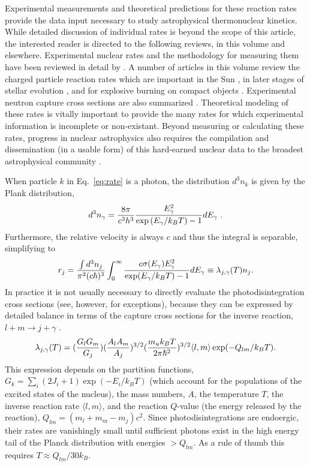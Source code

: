 \documentclass[12pt,modern,tighten,times,apj]{aastex61}
\begin{document}
Experimental measurements and theoretical predictions for these reaction rates provide the data input necessary to study astrophysical thermonuclear kinetics.  
While detailed discussion of individual rates is beyond the scope of this article, the interested reader is directed to the following reviews, in this volume and elsewhere.  
Experimental nuclear rates and the methodology for measuring them have been reviewed in detail by \cite{RoRo88,KaTW98}.  
A number of articles in this volume review the charged particle reaction rates which are important in the Sun \cite{HaPR04}, in later stages of stellar evolution \cite{BuBa04}, and for explosive burning on compact objects \cite{AnSB04,HeJI04,ReSc04}.  
Experimental neutron capture cross sections are also summarized \cite{KaMe04,BaKa00}.  
Theoretical modeling of these rates \cite{RaDe04,MaNW04} is vitally important to provide the many rates for which experimental information is incomplete or non-existant.  
Beyond measuring or calculating these rates, progress in nuclear astrophysics also requires the compilation and dissemination (in a usable form) of this hard-earned nuclear data to the broadest astrophysical community \cite{CaFo88,GRSD04,Smit03}. 

When particle $k$ in Eq.~\ref{eq:rate} is a photon, the distribution $d^3n_k$ is given by the Plank distribution,  
\begin{equation}
    d^3n_{\gamma} =  {{8 \pi} \over {c^3 h^3}} {{E_{\gamma}^2} \over
    {\exp \left(E_{\gamma} /k_B T\right)-1}} dE_{\gamma} \ .
\end{equation}
Furthermore, the relative velocity is always $c$ and thus the integral is separable, simplifying to 
\begin{equation}
    r_j  = {{\int d^3n_j}\over {\pi ^2 (c \hbar )^3}} \int_0 ^\infty {{c 
    \sigma(E_\gamma ) E_{\gamma}^2} \over {{\rm exp}(E_\gamma /k_B T) -1}} dE_
    \gamma \equiv \lambda_{j,\gamma} (T) n_j. 
    \label{eq:phrate}
\end{equation}
In practice it is not usually necessary to directly evaluate the photodisintegration cross sections (see, however, \cite{MoZU04} for exceptions), because they can be expressed by detailed balance in terms of the capture cross sections for the inverse reaction, $l+m\rightarrow j+\gamma$ \cite{FoCZ67} .
\begin{equation}
    \lambda_{j,\gamma} (T)= ({{G_l G_m} \over G_j}) ({{A_l A_m} \over A_j})
    ^{3/2} ({{m_u k_B T} \over {2\pi \hbar^2}})^{3/2} \langle l,m \rangle 
    \exp (-Q_{lm}/k_B T).
    \label{eq:detbal}
\end{equation}
This expression depends on the partition functions, $G_{k}=\sum_i (2J_i+1) \exp (-E_i/k_B T)$ (which account for the populations of the excited states of the nucleus), the mass numbers, $A$, the temperature $T$, the inverse reaction rate $\langle l,m \rangle$, and the reaction $Q$-value (the energy released by the reaction), $Q_{lm}=(m_l+m_m-m_j) c^2$.  
Since photodisintegrations are endoergic, their rates are vanishingly small until sufficient photons exist in the high energy tail of the Planck distribution with energies $> Q_{{lm}}$.  
As a rule of thumb this requires $T$$\approx$$Q_{lm}/30 k_{B}$.
\end{document}
